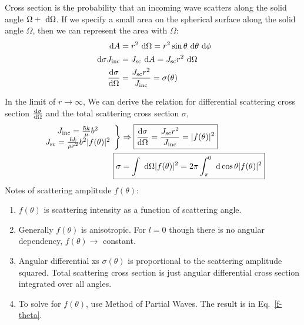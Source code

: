 \documentclass{school-22.101-notes}
\begin{document}
Cross section is the probability that an incoming wave scatters along the solid angle $\Omega+\mbox{ }\mathrm{d} \Omega$. If we specify a small area on the spherical surface along the solid angle $\Omega$, then we can represent the area with $\Omega$:
\begin{align}
\mbox{ }\mathrm{d} A &= r^2 \mbox{ }\mathrm{d} \Omega = r^2 \sin \theta \mbox{ }\mathrm{d} \theta \mbox{ }\mathrm{d} \phi \\
\mbox{ }\mathrm{d} \sigma J_{\mathrm{inc}} &= J_{\mathrm{sc}} \mbox{ }\mathrm{d} A = J_{\mathrm{sc}} r^2 \mbox{ }\mathrm{d} \Omega \\
\frac{\mathrm{d}\sigma}{\mathrm{d}\Omega} &= \frac{J_{\mathrm{sc}} r^2}{J_{\mathrm{inc}}} = \sigma(\theta) 
\end{align}

In the limit of $r \to \infty$, 
We can derive the relation for differential scattering cross section $\frac{\mathrm{d}\sigma}{\mathrm{d}\Omega}$ and the total scattering cross section $\sigma$, 
\begin{align}
\left. \begin{array}{c}
J_{\mathrm{inc}} = \frac{\hbar k}{\mu} b^2  \\
J_{\mathrm{sc}} = \frac{\hbar k}{\mu r^2} b^2 |f(\theta)|^2 \\
\end{array} \right\} & \Rightarrow \boxed{\dsigmadOmega =  \frac{J_{\mathrm{sc}} r^2}{ J_{\mathrm{inc}}} = |f(\theta)|^2 }  \\
\Aboxed{ \sigma &= \int \dOmega |f(\theta)|^2  = 2 \pi \int_{\pi}^0 \derivative \cos \theta |f(\theta)|^2 }
\end{align}
Notes of scattering amplitude $f(\theta)$: 
\begin{enumerate}
\item $f(\theta)$ is scattering intensity as a function of scattering angle.
\item Generally $f(\theta)$ is anisotropic. For $l=0$ though there is no angular dependency, $f(\theta) \to $ constant. 
\item Angular differential xs $\sigma(\theta)$ is proportional to the scattering amplitude squared. Total scattering cross section is just angular differential cross section integrated over all angles.  
\item To solve for $f(\theta)$, use Method of Partial Waves. The result is in Eq.~\ref{f-theta}. 
\end{enumerate}
\end{document}

